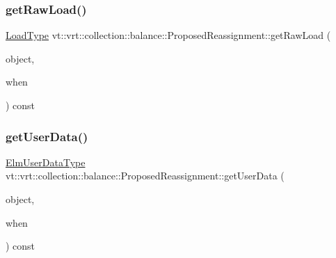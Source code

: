 \mbox{\label{structvt_1_1vrt_1_1collection_1_1balance_1_1_proposed_reassignment_a7eeaea5e4a91b02e143d66eba12eaeff}} 
\subsubsection{\texorpdfstring{get\+Raw\+Load()}{getRawLoad()}}
{\footnotesize\ttfamily \hyperlink{namespacevt_a8fb51741340b87d7aaee0bef60e9896b}{Load\+Type} vt\+::vrt\+::collection\+::balance\+::\+Proposed\+Reassignment\+::get\+Raw\+Load (\begin{DoxyParamCaption}\item[{\hyperlink{namespacevt_1_1vrt_1_1collection_1_1balance_a9f5b53fafb270212279a4757d2c4cd28}{Element\+I\+D\+Struct}}]{object,  }\item[{\hyperlink{structvt_1_1vrt_1_1collection_1_1balance_1_1_phase_offset}{Phase\+Offset}}]{when }\end{DoxyParamCaption}) const\hspace{0.3cm}{\ttfamily [override]}}

\mbox{\label{structvt_1_1vrt_1_1collection_1_1balance_1_1_proposed_reassignment_a30fea286c8e72b3b4533c5b384179ce4}} 
\subsubsection{\texorpdfstring{get\+User\+Data()}{getUserData()}}
{\footnotesize\ttfamily \hyperlink{namespacevt_1_1vrt_1_1collection_1_1balance_abf9eea0f4c24e41036ab844025e7d4c8}{Elm\+User\+Data\+Type} vt\+::vrt\+::collection\+::balance\+::\+Proposed\+Reassignment\+::get\+User\+Data (\begin{DoxyParamCaption}\item[{\hyperlink{namespacevt_1_1vrt_1_1collection_1_1balance_a9f5b53fafb270212279a4757d2c4cd28}{Element\+I\+D\+Struct}}]{object,  }\item[{\hyperlink{structvt_1_1vrt_1_1collection_1_1balance_1_1_phase_offset}{Phase\+Offset}}]{when }\end{DoxyParamCaption}) const\hspace{0.3cm}{\ttfamily [override]}}




